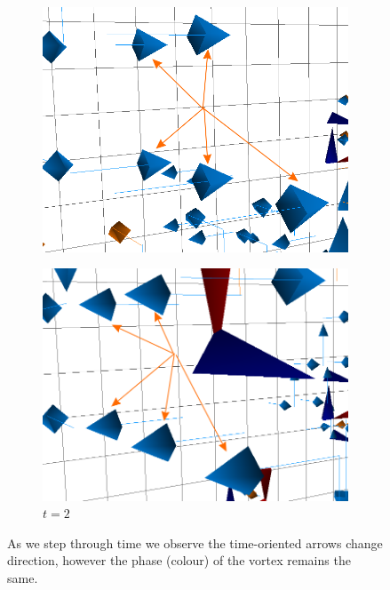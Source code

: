 \begin{figure}[htb!]
\centering
\begin{subfigure}[b]{0.45\textwidth}
\centering
\includegraphics[height=0.2\textheight]{./plaqlinet1_forwardarrows.png}
\end{subfigure}
\hfill
\begin{subfigure}[b]{0.45\textwidth}
\centering
\includegraphics[height=0.2\textheight]{./plaqlinet2_backwardarrows.png}
\caption{\label{fig:VortexArrows2}$t=2$}
\end{subfigure}
\caption{\label{fig:VortexArrows}As we step through time we observe the time-oriented arrows change direction, however the phase (colour) of the vortex remains the same.}
\end{figure}

